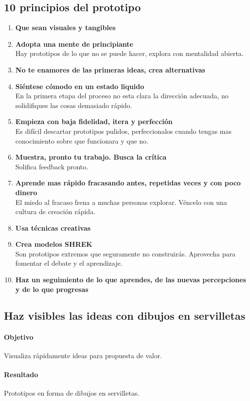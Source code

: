 \documentclass[11pt]{book}
\begin{document}
\subsection{10 principios del prototipo}
\begin{enumerate}
\item \textbf{ Que sean visuales y tangibles }
\item \textbf{ Adopta una mente de principiante }\\ Hay prototipos de lo que no se puede hacer, explora con mentalidad abierta.
\item \textbf{ No te enamores de las primeras ideas, crea alternativas}
\item \textbf{ Siéntese cómodo en un estado liquido }\\ En la primera etapa del proceso no esta clara la dirección adecuada, no solidifiques las cosas demasiado rápido.
\item \textbf{ Empieza con baja fidelidad, itera y perfección }\\ Es difícil descartar prototipos pulidos, perfeccionalos cuando tengas mas conocimiento sobre que funcionara y que no.
\item \textbf{ Muestra, pronto tu trabajo. Busca la crítica }\\ Solifica feedback pronto.
\item \textbf{ Aprende mas rápido fracasando antes, repetidas veces y con poco dinero } \\ El miedo al fracaso frena a muchas personas explorar. Véncelo con una cultura de creación rápida.
\item \textbf{ Usa técnicas creativas}
\item \textbf{ Crea modelos SHREK }\\ Son prototipos extremos que seguramente no construirás. Aprovecha para fomentar el debate y el aprendizaje.
\item \textbf{ Haz un seguimiento de lo que aprendes, de las nuevas percepciones y de lo que progresas }
\end{enumerate}
\subsection{Haz visibles las ideas con dibujos en servilletas}
\paragraph{Objetivo}
Visualiza rápidamente ideas para propuesta de valor.
\paragraph{Resultado}
Prototipos en forma de dibujos en servilletas.
\end{document}
